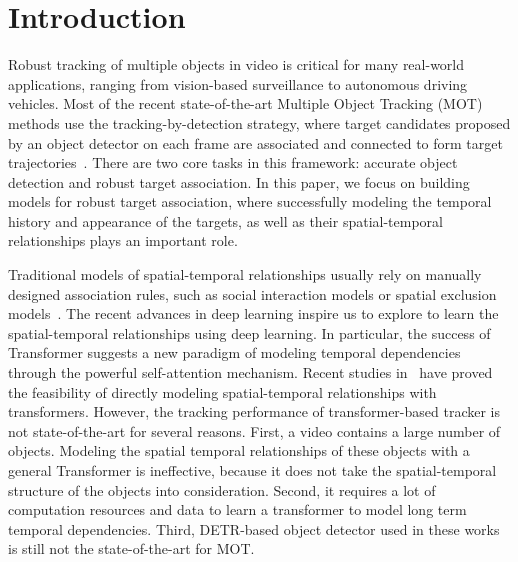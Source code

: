\documentclass[10pt,twocolumn,letterpaper]{article}
\newcommand{\tb}{}
\begin{document}
\section{Introduction}

Robust tracking of multiple objects in video is critical for many real-world applications, ranging from vision-based surveillance to autonomous driving vehicles. Most of the recent state-of-the-art Multiple Object Tracking (MOT) \tb{methods} use the tracking-by-detection strategy, where target candidates proposed by an object detector on each frame are associated and connected to form target trajectories~\cite{bae2018confidence,fagot2016improving,keuper2018motion,milan2016multi,pirsiavash2011globally,wang2016tracking,xiang2015learning}.
There are two core tasks in this framework: accurate object detection and robust target association. 
In this paper, we \tb{focus} on building models for robust target association, where successfully modeling the temporal history and appearance of the targets, as well as their spatial-temporal relationships plays an important role.

Traditional models of spatial-temporal relationships usually \tb{rely} on manually \tb{designed} association rules, such as social interaction models or spatial exclusion models~\cite{luo2020multiple}. The recent advances in deep learning \tb{inspire} us to explore to learn the spatial-temporal relationships using deep learning. In particular, the success of Transformer suggests a new paradigm of modeling temporal dependencies through the powerful self-attention mechanism. Recent studies in~\cite{sun2020transtrack,meinhardt2021trackformer} have proved the feasibility of directly modeling spatial-temporal relationships with transformers. However, the tracking performance of transformer-based tracker is not state-of-the-art for several reasons. First, a video contains a large number of objects. Modeling the spatial temporal relationships of these objects with a general Transformer is \tb{ineffective}, because it does not take the spatial-temporal structure of the objects into consideration. Second, it requires a lot of computation resources and data to learn a transformer to model long term temporal dependencies. Third, DETR-based object detector used in these works is still not the state-of-the-art for MOT.  
\end{document}

